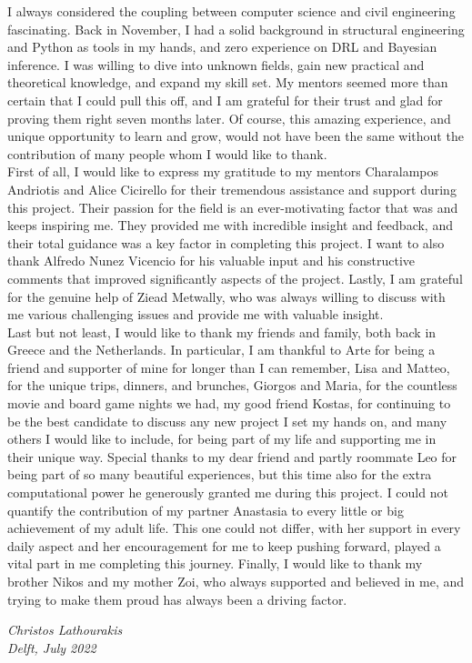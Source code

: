 I always considered the coupling between computer science and civil engineering fascinating. Back in November, I had a solid background in structural engineering and Python as tools in my hands, and zero experience on \acrfull{DRL} and Bayesian inference. I was willing to dive into unknown fields, gain new practical and theoretical knowledge, and expand my skill set. My mentors seemed more than certain that I could pull this off, and I am grateful for their trust and glad for proving them right seven months later. Of course, this amazing experience, and unique opportunity to learn and grow, would not have been the same without the contribution of many people whom I would like to thank.\\


First of all, I would like to express my gratitude to my mentors Charalampos Andriotis and Alice Cicirello for their tremendous assistance and support during this project. Their passion for the field is an ever-motivating factor that was and keeps inspiring me. They provided me with incredible insight and feedback, and their total guidance was a key factor in completing this project. I want to also thank Alfredo Nunez Vicencio for his valuable input and his constructive comments that improved significantly aspects of the project. Lastly, I am grateful for the genuine help of Ziead Metwally, who was always willing to discuss with me various challenging issues and provide me with valuable insight.\\

Last but not least, I would like to thank my friends and family, both back in Greece and the Netherlands. In particular, I am thankful to Arte for being a friend and supporter of mine for longer than I can remember, Lisa and Matteo, for the unique trips, dinners, and brunches, Giorgos and Maria, for the countless movie and board game nights we had, my good friend Kostas, for continuing to be the best candidate to discuss any new project I set my hands on, and many others I would like to include, for being part of my life and supporting me in their unique way. Special thanks to my dear friend and partly roommate Leo for being part of so many beautiful experiences, but this time also for the extra computational power he generously granted me during this project. I could not quantify the contribution of my partner Anastasia to every little or big achievement of my adult life. This one could not differ, with her support in every daily aspect and her encouragement for me to keep pushing forward, played a vital part in me completing this journey. Finally, I would like to thank my brother Nikos and my mother Zoi, who always supported and believed in me, and trying to make them proud has always been a driving factor.

\vspace{0.5cm}

\begin{flushright}
    \emph{Christos Lathourakis}\\
    \emph{Delft, July 2022}
\end{flushright}